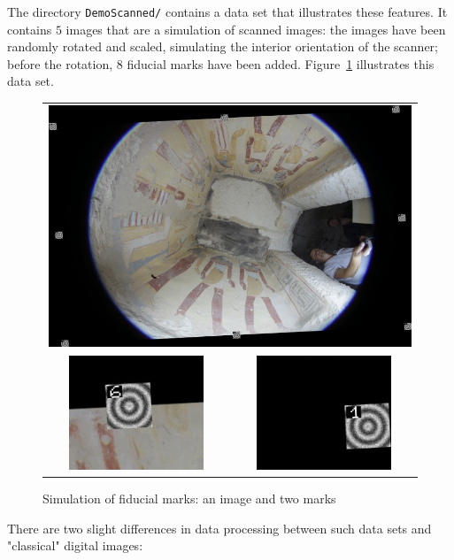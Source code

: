 The directory {\tt DemoScanned/} contains a data set that illustrates these
features. It contains $5$ images that are a simulation of scanned
images: the images have been randomly rotated and scaled, simulating the
interior orientation of the scanner; before the rotation, $8$  fiducial marks have
been added. Figure~\ref{ImFid} illustrates this data set.


\begin{figure}
\begin{tabular}{||c|c||}
   \hline \hline
   \multicolumn{2}{c|}{\includegraphics[width=120mm]{FIGS/Niche/ImGlob.jpg}} \\
   \includegraphics[width=40mm]{FIGS/Niche/Cible1.jpg} &
   \includegraphics[width=40mm]{FIGS/Niche/Cible2.jpg}
\end{tabular}
\caption{Simulation of fiducial marks: an image and two marks }
\label{ImFid}
\end{figure}


There are two slight differences in data processing between such data sets and "classical" digital images:


